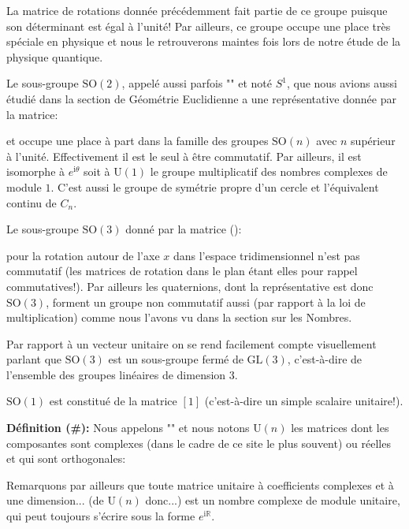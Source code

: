 	La matrice de rotations donnée précédemment fait partie de ce groupe puisque son déterminant est égal à l'unité! Par ailleurs, ce groupe occupe une place très spéciale en physique et nous le retrouverons maintes fois lors de notre étude de la physique quantique.
	
	Le sous-groupe $\text{SO}(2)$, appelé aussi parfois "" et noté $S^1$, que nous avions aussi étudié dans la section de Géométrie Euclidienne a une représentative donnée par la matrice:
	
	et occupe une place à part dans la famille des groupes $\text{SO}(n)$ avec $n$ supérieur à l'unité. Effectivement il est le seul à être commutatif. Par ailleurs, il est isomorphe à $e^{\mathrm{i}\theta}$ soit à $\text{U}(1)$ le groupe multiplicatif des nombres complexes de module $1$. C'est aussi le groupe de symétrie propre d'un cercle et l'équivalent continu de $C_n$.
	
	Le sous-groupe $\text{SO}(3)$ donné par la matrice ():
	
	pour la rotation autour de l'axe $x$ dans l'espace tridimensionnel n'est pas commutatif (les matrices de rotation dans le plan étant elles pour rappel commutatives!). Par ailleurs les quaternions, dont la représentative est donc $\text{SO}(3)$, forment un groupe non commutatif aussi (par rapport à la loi de multiplication) comme nous l'avons vu dans la section sur les Nombres.
	
	Par rapport à un vecteur unitaire on se rend facilement compte visuellement parlant que $\text{SO} (3)$ est un sous-groupe fermé de $\text{GL}(3)$, c'est-à-dire de l'ensemble des groupes linéaires de dimension $3$.
	
	\begin{tcolorbox}[title=Remarque,colframe=black,arc=10pt]
	$\text{SO}(1)$  est constitué de la matrice $[1]$ (c'est-à-dire un simple scalaire unitaire!).
	\end{tcolorbox}	
	\textbf{Définition (\#\mydef):} Nous appelons "\label{unitary linear group}" et nous notons $\text{U}(n)$ les matrices dont les composantes sont complexes (dans le cadre de ce site le plus souvent) ou réelles et qui sont orthogonales:
	
	Remarquons par ailleurs que toute matrice unitaire à coefficients complexes et à une dimension... (de $\text{U}(n)$ donc...) est un nombre complexe de module unitaire, qui peut toujours s'écrire sous la forme $e^{\mathrm{i}\mathbb{R}}$.
	
